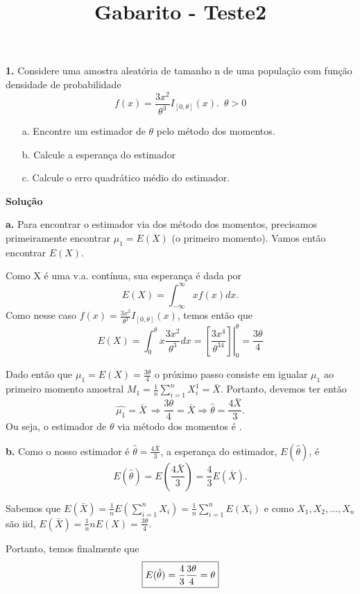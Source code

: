 \documentclass[12pt,a4paper]{article}
\title{Gabarito - Teste2}
\date{}
\begin{document}
\maketitle

\textbf{1.} Considere uma amostra aleatória de tamanho n de uma população com função densidade de probabilidade $$f(x) = \frac{3x^2}{\theta^3} I_{[0,\theta]}(x). \, \, \, \theta > 0$$

\begin{itemize}
	\item[a.] Encontre um estimador de $\theta$ pelo método dos momentos.
	\item[b.] Calcule a esperança do estimador
	\item[c.] Calcule o erro quadrático médio do estimador.
\end{itemize}

\textbf{Solução}
\bigskip

\textbf{a.} Para encontrar o estimador via dos método dos momentos, precisamos primeiramente encontrar $\mu_1 = E(X)$ (o primeiro momento). Vamos então encontrar $E(X)$. 

Como X é uma v.a. contínua, sua esperança é dada por $$E(X) = \int_{-\infty}^{\infty} xf(x)dx.$$ Como nesse caso $f(x) = \frac{3x^2}{\theta^3} I_{[0,\theta]}(x)$, temos então que $$E(X) = \int_{0}^{\theta} x\frac{3x^2}{\theta^3}dx = \left.\left[\frac{3x^4}{\theta^34}\right]\right|_{0}^{\theta} = \frac{3\theta}{4}$$

Dado então que $\mu_1 = E(X) = \frac{3\theta}{4}$ o próximo passo consiste em igualar $\mu_1$ ao primeiro momento amostral $M_1 = \frac{1}{n}\sum_{i=1}^n X_i^1 = \bar{X}$. Portanto, devemos ter então $$\hat{\mu_1} = \bar{X} \, \Rightarrow \frac{3\theta}{4}=\bar{X} \Rightarrow \hat{\theta} = \frac{4\bar{X}}{3}.$$ Ou seja, o estimador de $\theta$ via método dos momentos é .

\bigskip

\textbf{b.} Como o nosso estimador é $\hat{\theta} = \frac{4\bar{X}}{3}$, a esperança do estimador, $E(\hat{\theta})$, é $$E(\hat{\theta}) = E(\frac{4\bar{X}}{3}) = \frac{4}{3}E(\bar{X}).$$

Sabemos que $E(\bar{X}) = \frac{1}{n}E(\sum_{i=1}^nX_i) = \frac{1}{n}\sum_{i=1}^nE(X_i)$ e como $X_1, X_2, \dots, X_n$ são iid, $E(\bar{X}) = \frac{1}{n}nE(X) = \frac{3\theta}{4}$. 

Portanto, temos finalmente que $$\fbox{$E(\hat{\theta}) = \dfrac{4}{3}\dfrac{3\theta}{4} = 
\theta$}$$
\end{document}
